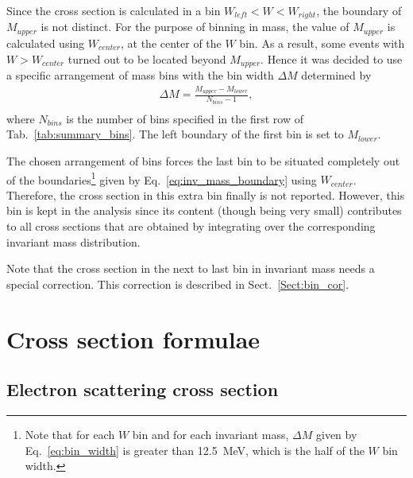 Since the cross section is calculated in a bin $W_{left} < W < W_{right}$, the boundary of $M_{upper}$ is not distinct. For the purpose of binning in mass, the value of $M_{upper}$ is calculated using $W_{center}$, at the center of the $W$ bin. As a result, some events with $W > W_{center}$ turned out to be located beyond $M_{upper}$. Hence it was decided to use a specific arrangement of mass bins with the bin width $\Delta M$ determined by\vspace{-0.75em}
\begin{equation}
\begin{aligned}
\Delta M = \frac{M_{upper}-M_{lower}}{N_{bins}-1}, \\[-40pt]\label{eq:bin_width}
\end{aligned}  
\end{equation} 
where $N_{bins}$ is the number of bins specified in the first row of Tab.~\ref{tab:summary_bins}. The left boundary of the first bin is set to $M_{lower}$.

The chosen arrangement of bins forces the last bin to be situated completely out of the boundaries\footnote[9]{Note that for each $W$ bin and for each invariant mass, $\Delta M$ given by Eq.~\eqref{eq:bin_width} is greater than 12.5~MeV, which is the half of the $W$ bin width.} given by Eq.~\eqref{eq:inv_mass_boundary} using $W_{center}$. Therefore, the cross section in this extra bin finally is not reported. However, this bin is kept in the analysis since its content (though being very small) contributes to all cross sections that are obtained by integrating over the corresponding invariant mass distribution. 


Note that the cross section in the next to last bin in invariant mass needs a special correction. This correction is described in Sect.~\ref{Sect:bin_cor}.




\section{Cross section formulae}
\label{Sect:cr_sect_formula}

\subsection{Electron scattering cross section}

